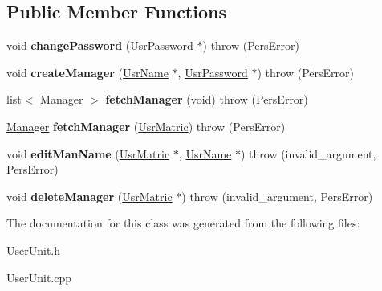 \subsection*{Public Member Functions}
\begin{DoxyCompactItemize}
\item 
\hypertarget{classStubUserManAdm_a63130507e95ab092b0bf09704b13b6ec}{void {\bfseries change\-Password} (\hyperlink{classUsrPassword}{Usr\-Password} $\ast$)  throw (\-Pers\-Error)}\label{dd/dfd/classStubUserManAdm_a63130507e95ab092b0bf09704b13b6ec}

\item 
\hypertarget{classStubUserManAdm_ac833e3729b1adf46edf78376719acde5}{void {\bfseries create\-Manager} (\hyperlink{classUsrName}{Usr\-Name} $\ast$, \hyperlink{classUsrPassword}{Usr\-Password} $\ast$)  throw (\-Pers\-Error)}\label{dd/dfd/classStubUserManAdm_ac833e3729b1adf46edf78376719acde5}

\item 
\hypertarget{classStubUserManAdm_a5aa1a8d94912f9971f17bcd8a52dfa7c}{list$<$ \hyperlink{classManager}{Manager} $>$ {\bfseries fetch\-Manager} (void)  throw (\-Pers\-Error)}\label{dd/dfd/classStubUserManAdm_a5aa1a8d94912f9971f17bcd8a52dfa7c}

\item 
\hypertarget{classStubUserManAdm_a66bdd469d275154728c929e0581aaa71}{\hyperlink{classManager}{Manager} {\bfseries fetch\-Manager} (\hyperlink{classUsrMatric}{Usr\-Matric})  throw (\-Pers\-Error)}\label{dd/dfd/classStubUserManAdm_a66bdd469d275154728c929e0581aaa71}

\item 
\hypertarget{classStubUserManAdm_ac1da713638e441434c8ec426be495a0b}{void {\bfseries edit\-Man\-Name} (\hyperlink{classUsrMatric}{Usr\-Matric} $\ast$, \hyperlink{classUsrName}{Usr\-Name} $\ast$)  throw (invalid\-\_\-argument, Pers\-Error)}\label{dd/dfd/classStubUserManAdm_ac1da713638e441434c8ec426be495a0b}

\item 
\hypertarget{classStubUserManAdm_a45f93196f3de7a92ebd0688007b47e5f}{void {\bfseries delete\-Manager} (\hyperlink{classUsrMatric}{Usr\-Matric} $\ast$)  throw (invalid\-\_\-argument, Pers\-Error)}\label{dd/dfd/classStubUserManAdm_a45f93196f3de7a92ebd0688007b47e5f}

\end{DoxyCompactItemize}


The documentation for this class was generated from the following files\-:\begin{DoxyCompactItemize}
\item 
User\-Unit.\-h\item 
User\-Unit.\-cpp\end{DoxyCompactItemize}
